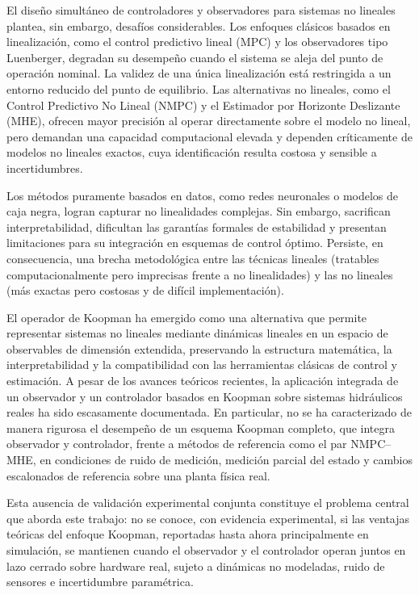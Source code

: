 \documentclass[12pt,letterpaper]{article}
\begin{document}
El diseño simultáneo de controladores y observadores para sistemas no lineales
plantea, sin embargo, desafíos considerables. Los enfoques clásicos basados en
linealización, como el control predictivo lineal (MPC) y los observadores tipo
Luenberger, degradan su desempeño cuando el sistema se aleja del punto de operación
nominal. La validez de una única linealización está restringida a un entorno
reducido del punto de equilibrio. Las alternativas no lineales, como el Control
Predictivo No Lineal (NMPC) y el Estimador por Horizonte Deslizante (MHE), ofrecen
mayor precisión al operar directamente sobre el modelo no lineal, pero demandan una
capacidad computacional elevada y dependen críticamente de modelos no lineales
exactos, cuya identificación resulta costosa y sensible a incertidumbres.

Los métodos puramente basados en datos, como redes neuronales o modelos de caja
negra, logran capturar no linealidades complejas. Sin embargo, sacrifican
interpretabilidad, dificultan las garantías formales de estabilidad y presentan
limitaciones para su integración en esquemas de control óptimo. Persiste, en
consecuencia, una brecha metodológica entre las técnicas lineales (tratables
computacionalmente pero imprecisas frente a no linealidades) y las no lineales (más
exactas pero costosas y de difícil implementación).

El operador de Koopman ha emergido como una alternativa que permite representar
sistemas no lineales mediante dinámicas lineales en un espacio de observables de
dimensión extendida, preservando la estructura matemática, la interpretabilidad y la
compatibilidad con las herramientas clásicas de control y estimación. A pesar de los
avances teóricos recientes, la aplicación integrada de un observador y un
controlador basados en Koopman sobre sistemas hidráulicos reales ha sido escasamente
documentada. En particular, no se ha caracterizado de manera rigurosa el desempeño
de un esquema Koopman completo, que integra observador y controlador, frente a
métodos de referencia como el par NMPC--MHE, en condiciones de ruido de medición,
medición parcial del estado y cambios escalonados de referencia sobre una planta
física real.

Esta ausencia de validación experimental conjunta constituye el problema central que
aborda este trabajo: no se conoce, con evidencia experimental, si las ventajas
teóricas del enfoque Koopman, reportadas hasta ahora principalmente en simulación,
se mantienen cuando el observador y el controlador operan juntos en lazo cerrado
sobre hardware real, sujeto a dinámicas no modeladas, ruido de sensores e
incertidumbre paramétrica.
\end{document}
